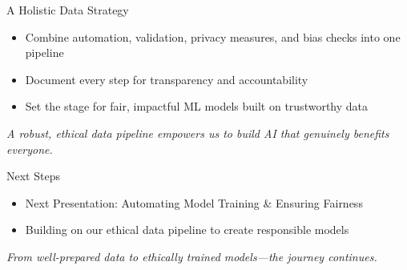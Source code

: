 \documentclass[aspectratio=169]{beamer}
\begin{document}
%
%
\begin{frame}{A Holistic Data Strategy}
\begin{itemize}
\item Combine automation, validation, privacy measures, and bias checks into one pipeline
\item Document every step for transparency and accountability
\item Set the stage for fair, impactful ML models built on trustworthy data
\end{itemize}

\vspace{0.8em}
\emph{A robust, ethical data pipeline empowers us to build AI that genuinely benefits everyone.}

\end{frame}

%
%
\begin{frame}{Next Steps}
\begin{itemize}
\item Next Presentation: Automating Model Training \& Ensuring Fairness
\item Building on our ethical data pipeline to create responsible models
\end{itemize}

\vspace{0.8em}
\emph{From well-prepared data to ethically trained models—the journey continues.}
\end{frame}
\end{document}
